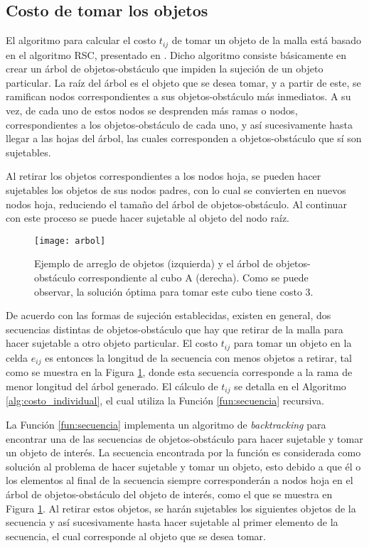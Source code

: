 \vspace{-\belowdisplayskip}%
%
%
\subsection{Costo de tomar los objetos}
\label{subsec:costo}
%
%
El algoritmo para calcular el costo $t_{ij}$ de tomar un objeto de la malla está basado en el algoritmo RSC, presentado en \cite{4209604}.
Dicho algoritmo consiste básicamente en crear un árbol de objetos-obstáculo que impiden la sujeción de un objeto particular. 
La raíz del árbol es el objeto que se desea tomar, y a partir de este, se ramifican nodos correspondientes a sus objetos-obstáculo más inmediatos.
A su vez, de cada uno de estos nodos se desprenden más ramas o nodos, correspondientes a los objetos-obstáculo de cada uno, y así sucesivamente hasta llegar a las hojas del árbol, las cuales corresponden a objetos-obstáculo que sí son sujetables.

Al retirar los objetos correspondientes a los nodos hoja, se pueden hacer sujetables los objetos de sus nodos padres, con lo cual se convierten en nuevos nodos hoja, reduciendo el tamaño del árbol de objetos-obstáculo.
Al continuar con este proceso se puede hacer sujetable al objeto del nodo raíz.
%
\begin{figure}[H]
\texttt{[image: arbol]}%
\caption{Ejemplo de arreglo de objetos (izquierda) y el árbol de objetos-obstáculo correspondiente al cubo A (derecha). Como se puede observar, la solución óptima para tomar este cubo tiene costo 3.}%
\label{fig:arbol}%
\end{figure}
%
De acuerdo con las formas de sujeción establecidas, existen en general, dos secuencias distintas de objetos-obstáculo que hay que retirar de la malla para hacer sujetable a otro objeto particular. 
El costo $t_{ij}$ para tomar un objeto en la celda $e_{ij}$ es entonces la longitud de la secuencia con menos objetos a retirar, tal como se muestra en la Figura \ref{fig:arbol}, donde esta secuencia corresponde a la rama de menor longitud del árbol generado.
El cálculo de $t_{ij}$ se detalla en el Algoritmo \ref{alg:costo_individual}, el cual utiliza la Función \ref{fun:secuencia} recursiva.

La Función \ref{fun:secuencia} implementa un algoritmo de \textit{backtracking} para encontrar una de las secuencias de objetos-obstáculo para hacer sujetable y tomar un objeto de interés.
La secuencia encontrada por la función es considerada como solución al problema de hacer sujetable y tomar un objeto, esto debido a que él o los elementos al final de la secuencia siempre corresponderán a nodos hoja en el árbol de objetos-obstáculo del objeto de interés, como el que se muestra en Figura \ref{fig:arbol}.
Al retirar estos objetos, se harán sujetables los siguientes objetos de la secuencia y así sucesivamente hasta hacer sujetable al primer elemento de la secuencia, el cual corresponde al objeto que se desea tomar.

